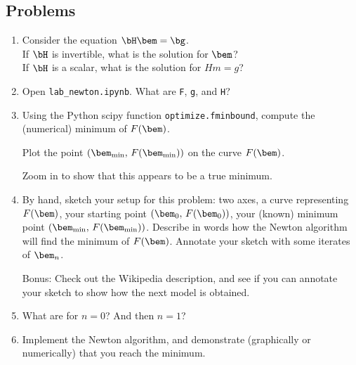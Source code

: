 \documentclass[11pt,titlepage,fleqn]{article}
\renewcommand{\vertgap}{\vspace{1.5cm}}
\newcommand{\tfile}{{\tt lab\_newton.ipynb}}
\begin{document}
\subsection*{Problems}

\begin{enumerate}
\item Consider the equation $\bH\bem = \bg$. \\
If $\bH$ is invertible, what is the solution for $\bem$? \\
If $\bH$ is a scalar, what is the solution for $Hm = g$?


\vertgap

\item Open \tfile. What are \verb+F+, \verb+g+, and \verb+H+?

\vertgap

\item Using the Python scipy function \verb+optimize.fminbound+, compute the (numerical) minimum of $F(\bem)$.

Plot the point $(\bem_{\rm min},\,F(\bem_{\rm min}))$ on the curve $F(\bem)$.

Zoom in to show that this appears to be a true minimum.

\item By hand, sketch your setup for this problem: two axes, a curve representing $F(\bem)$, your starting point $(\bem_0,\,F(\bem_0))$, your (known) minimum point $(\bem_{\rm min},\,F(\bem_{\rm min}))$. Describe in words how the Newton algorithm will find the minimum of $F(\bem)$. Annotate your sketch with some iterates of $\bem_n$.

Bonus: Check out the Wikipedia description, and see if you can annotate your sketch to show how the next model is obtained.

\vspace{10cm}

\item What are  for $n=0$? And then $n=1$?

\vertgap
\vertgap

\item Implement the Newton algorithm, and demonstrate (graphically or numerically) that you reach the minimum.


\end{enumerate}
\end{document}
